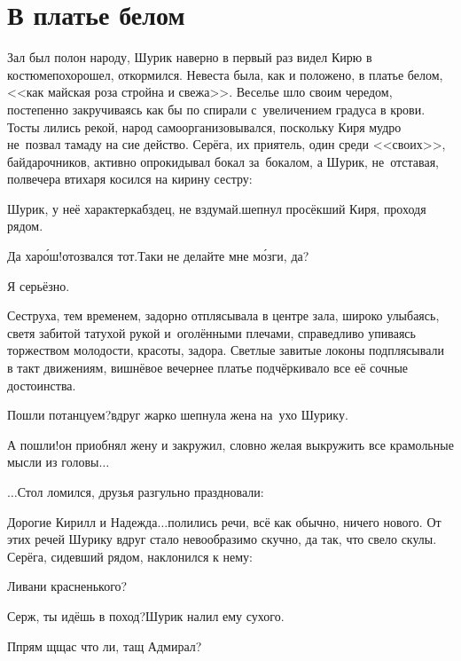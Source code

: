 {
\chapter{В платье белом}
\vepsianrose

\fancyhead[LE]{\fancyplain{}{\bfseries \parttitle}}
\fancyhead[RO]{\fancyplain{}{\bfseries \rightmark}}

Зал был полон народу, Шурик наверно в первый раз видел Кирю в костюме\mdash похорошел, откормился. Невеста была, как и положено, в платье белом, <<как майская роза стройна и свежа>>. Веселье шло своим чередом, постепенно закручиваясь как бы по спирали с~увеличением градуса в крови. Тосты лились рекой, народ самоорганизовывался, поскольку Киря мудро не~позвал тамаду на сие действо. Серёга, их приятель, один среди <<своих>>, байдарочников, активно опрокидывал бокал за~бокалом, а Шурик, не~отставая, полвечера втихаря косился на кирину сестру:

\diagdash Шурик, у неё характер\mdash кабздец, не вздумай.\mdash шепнул просёкший Киря, проходя рядом. 

\diagdash Да хар\'{о}ш!\mdash отозвался тот.\mdash Таки не делайте мне м\'{о}зги, да?

\diagdash Я серьёзно.

Сеструха, тем временем, задорно отплясывала в центре зала, широко улыбаясь, светя забитой татухой рукой и~оголёнными плечами, справедливо упиваясь торжеством молодости, красоты, задора. Светлые завитые локоны подплясывали в такт движениям, вишнёвое вечернее платье подчёркивало все её сочные достоинства.

\diagdash Пошли потанцуем?\mdash вдруг жарко шепнула жена на~ухо Шурику.

\diagdash А пошли!\mdash он приобнял жену и закружил, словно желая выкружить все крамольные мысли из головы$\ldots$

\vspace{0.5cm}
$\ldots$Стол ломился, друзья разгульно праздновали:

\diagdash Дорогие Кирилл и Надежда$\ldots$\mdash полились речи, всё как обычно, ничего нового. От этих речей Шурику вдруг стало невообразимо скучно, да так, что свело скулы. Серёга, сидевший рядом, наклонился к нему:

\diagdash Ливани красненького?

\diagdash Серж, ты идёшь в поход?\mdash Шурик налил ему сухого. 

\diagdash П\sdash прям щ\sdash щас что ли, тащ Адмирал?

}
